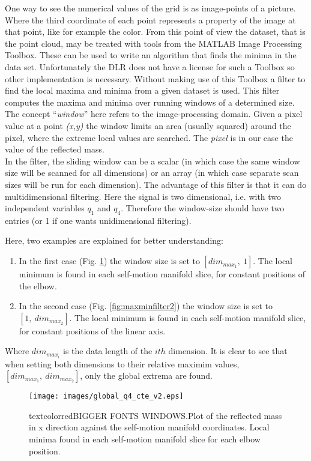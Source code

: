 %
One way to see the numerical values of the grid is as image-points of a picture. Where the third coordinate of each point represents a property of the image at that point, like for example the color. From this point of view the dataset, that is the point cloud, may be treated with tools from the MATLAB Image Processing Toolbox. These can be used to write an algorithm that finds the minima in the data set. Unfortunately the DLR does not have a license for such a Toolbox so other implementation is necessary.
Without making use of this Toolbox a filter \cite{minmaxfilter} to find the local maxima and minima from a given dataset is used. This filter computes the maxima and minima over running windows of a determined size. The concept “\textit{window}” here refers to the image-processing domain. Given a pixel value at a point \textit{(x,y)} the window limits an area (usually squared) around the pixel, where the extreme local values are searched. The \textit{pixel} is in our case  the value of the reflected mass.\\
%
In the filter, the sliding window can be a scalar (in which case the same window size will be scanned for all dimensions) or an array (in which case separate scan sizes will be run for each dimension). The advantage of this filter is that it can do multidimensional filtering. Here the signal is two dimensional, i.e. with two independent variables $q_1$ and $q_4$. Therefore the window-size should have two entries (or 1 if one wants unidimensional filtering).


Here, two examples are explained for better understanding:
\begin{enumerate}
	\item In the first case (Fig. \ref{fig:maxminfilter1}) the window size is set to $[dim_{max_{1}}, \ 1]$. The local minimum is found in each self-motion manifold slice, for constant positions of the elbow.
	\item In the second case (Fig. \ref{fig:maxminfilter2}) the window size is set to $[1, \ dim_{max_{2}}]$. The local minimum is found in each self-motion manifold slice, for constant positions of the linear axis.
	
\end{enumerate}

Where $dim_{max_{i}}$ is the data length of the $ith$ dimension. It is clear to see that when setting both dimensions to their relative maximim values, $[dim_{max_{1}}, \ dim_{max_{2}}]$, only the global extrema are found.


\begin{figure}[htb]
	\centerline{
		\texttt{[image: images/global\_q4\_cte\_v2.eps]}}
	\caption{textcolor{red}{BIGGER FONTS WINDOWS.}Plot of the reflected mass in x direction against the self-motion
		manifold coordinates. Local minima found in each self-motion manifold slice for each elbow position. }
	\label{fig:maxminfilter1}
\end{figure}

